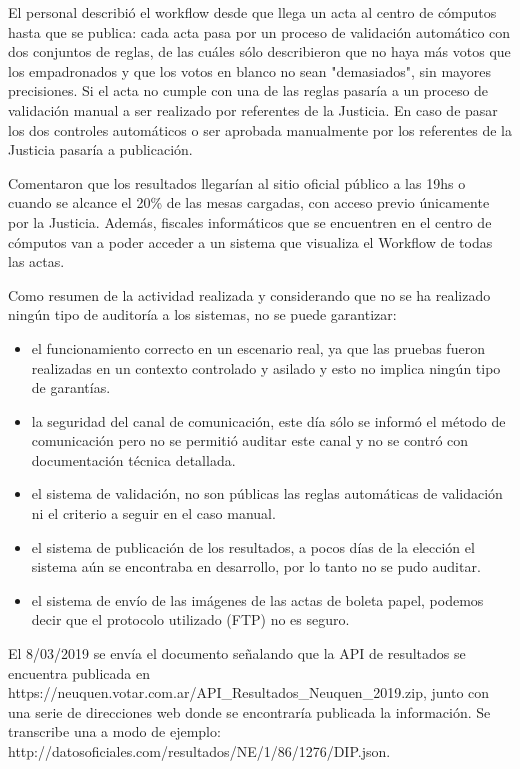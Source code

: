 El personal describió el workflow desde que llega un acta al centro de cómputos hasta que se publica: cada acta pasa por un proceso de validación automático con dos conjuntos de reglas, de las cuáles sólo describieron que no haya más votos que los empadronados y que los votos en blanco no sean "demasiados", sin mayores precisiones. Si el acta no cumple con una de las reglas pasaría a un proceso de validación manual a ser realizado por referentes de la Justicia. En caso de pasar los dos controles automáticos o ser aprobada manualmente por los referentes de la Justicia pasaría a publicación.\newline

Comentaron que los resultados llegarían al sitio oficial público a las 19hs o cuando se alcance el 20\% de las mesas cargadas, con acceso previo únicamente por la Justicia. Además, fiscales informáticos que se encuentren en el centro de cómputos van a poder acceder a un sistema que visualiza el Workflow de todas las actas.\newline

Como resumen de la actividad realizada y considerando que no se ha realizado ningún tipo de auditoría a los sistemas, no se puede garantizar:

\begin{itemize}
    \item el funcionamiento correcto en un escenario real, ya que las pruebas fueron realizadas en un contexto controlado y asilado y esto no implica ningún tipo de garantías.
    \item la seguridad del canal de comunicación, este día sólo se informó el método de comunicación pero no se permitió auditar este canal y no se contró con documentación técnica detallada.
    \item el sistema de validación, no son públicas las reglas automáticas de validación ni el criterio a seguir en el caso manual.
    \item el sistema de publicación de los resultados, a pocos días de la elección el sistema aún se encontraba en desarrollo, por lo tanto no se pudo auditar.
    \item el sistema de envío de las imágenes de las actas de boleta papel, podemos decir que el protocolo utilizado (FTP) no es seguro.
\end{itemize}
El 8/03/2019 se envía el documento señalando que la API de resultados se encuentra publicada en https://neuquen.votar.com.ar/API\_Resultados\_Neuquen\_2019.zip, junto con una serie de direcciones web donde se encontraría publicada la información. Se transcribe una a modo de ejemplo: http://datosoficiales.com/resultados/NE/1/86/1276/DIP.json. 

